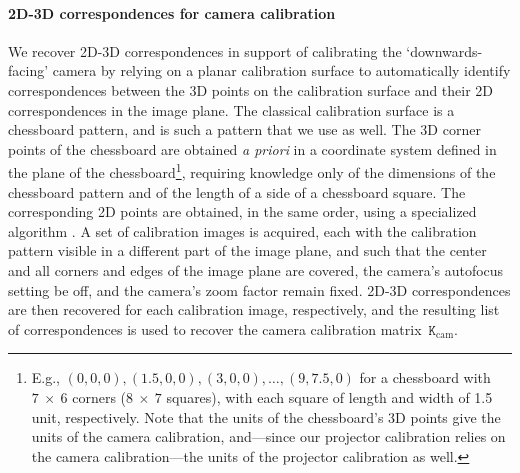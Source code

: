 \documentclass[review]{elsarticle}
\begin{document}
\paragraph{2D-3D correspondences for camera calibration} We recover 2D-3D correspondences in support of calibrating the `downwards-facing' camera by relying on a planar calibration surface to automatically identify correspondences between the 3D points on the calibration surface and their 2D correspondences in the image plane. The classical calibration surface is a chessboard pattern, and is such a pattern that we use as well. The 3D corner points of the chessboard are obtained \textit{a priori} in a coordinate system defined in the plane of the chessboard\footnote{E.g., $(0,0,0), (1.5,0,0), (3,0,0), \dots, (9,7.5,0)$ for a chessboard with $7~\times{}~6$ corners ($8~\times{}~7$ squares), with each square of length and width of 1.5 unit, respectively. Note that the units of the chessboard's 3D points give the units of the camera calibration, and---since our projector calibration relies on the camera calibration---the units of the projector calibration as well.}, requiring knowledge only of the dimensions of the chessboard pattern and of the length of a side of a chessboard square. The corresponding 2D points are obtained, in the same order, using a specialized algorithm \cite{bradski2000opencv}. A set of calibration images is acquired, each with the calibration pattern visible in a different part of the image plane, and such that the center and all corners and edges of the image plane are covered, the camera's autofocus setting be off, and the camera's zoom factor remain fixed. 2D-3D correspondences are then recovered for each calibration image, respectively, and the resulting list of correspondences is used to recover the camera calibration matrix~$\mathtt{K}_\text{cam}$. 
\end{document}
